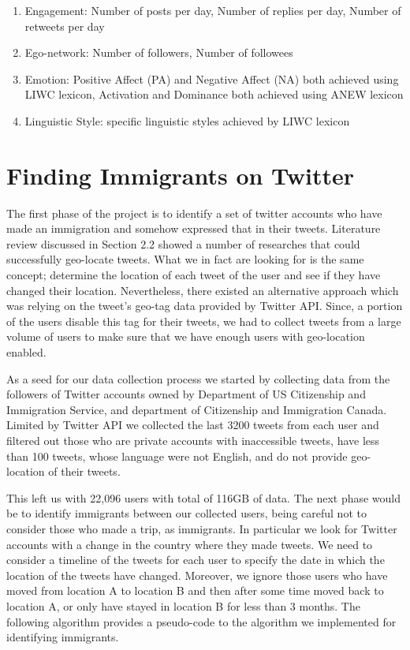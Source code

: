\documentclass{article}
\begin{document}
\begin{enumerate}
    \item Engagement: Number of posts per day, Number of replies per day, Number of retweets per day
    \item Ego-network: Number of followers, Number of followees
    \item Emotion: Positive Affect (PA) and Negative Affect (NA) both achieved using LIWC lexicon, Activation and Dominance both achieved using ANEW lexicon
    \item Linguistic Style: specific linguistic styles achieved by LIWC lexicon
\end{enumerate}


\section{Finding Immigrants on Twitter}

The first phase of the project is to identify a set of twitter accounts who have made an immigration and somehow expressed that in their tweets. Literature review discussed in Section 2.2 showed a number of researches that could successfully geo-locate tweets. What we in fact are looking for is the same concept; determine the location of each tweet of the user and see if they have changed their location. Nevertheless, there existed an alternative approach which was relying on the tweet's geo-tag data provided by Twitter API. Since, a portion of the users disable this tag for their tweets, we had to collect tweets from a large volume of users to make sure that we have enough users with geo-location enabled. 

As a seed for our data collection process we started by collecting data from the followers of Twitter accounts owned by Department of US Citizenship and Immigration Service, and department of Citizenship and Immigration Canada. Limited by Twitter API we collected the last 3200 tweets from each user and filtered out those who are private accounts with inaccessible tweets, have less than 100 tweets, whose language were not English, and do not provide geo-location of their tweets.

This left us with 22,096 users with total of 116GB of data. The next phase would be to identify immigrants between our collected users, being careful not to consider those who made a trip, as immigrants. In particular we look for Twitter accounts with a change in the country where they made tweets. We need to consider a timeline of the tweets for each user to specify the date in which the location of the tweets have changed. Moreover, we ignore those users who have moved from location A to location B and then after some time moved back to location A, or only have stayed in location B for less than 3 months. The following algorithm provides a pseudo-code to the algorithm we implemented for identifying immigrants. 
\end{document}
